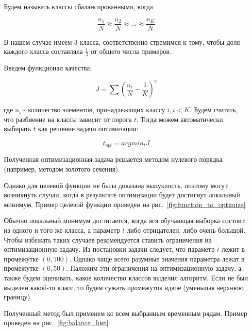 \documentclass[a4paper,article,14pt]{extarticle}
\begin{document}
Будем называть классы сбалансированными, когда

\begin{equation}
    \frac{n_1}{N} \approx \frac{n_2}{N} \approx \dots \approx \frac{n_K}{N}
    \label{eq:balanced}
\end{equation}

В нашем случае имеем 3 класса, соответственно стремимся к тому, чтобы доля каждого класса составляла $\frac{1}{3}$ от общего числа примеров.

Введем функционал качества:

\begin{equation}
    J=\sum{(\frac{n_i}{N} - \frac{1}{K}) ^ 2}
    \label{eq:error_func}
\end{equation}

где $n_i$ - количество элементов, принадлежащих классу $i, i < K$.
Будем считать, что разбиение на классы зависит от порога $t$.
Тогда можем автоматически выбирать $t$ как решение задачи оптимизации:

\begin{equation}
    t_{opt} = argmin_t J
    \label{eq:equation4}
\end{equation}

Полученная оптимизационная задача решается методом нулевого порядка (например, методом золотого сечения).

Однако для целевой функции не была доказана выпуклость, поэтому могут возникнуть случаи, когда в результате оптимизации будет достигнут локальный минимум.
Пример целевой функции приведен на рис.~\ref{fig:function_to_optimize}



Обычно локальный минимум достигается, когда вся обучающая выборка состоит из одного и того же класса, а параметр $t$ либо отрицателен, либо очень большой.
Чтобы избежать таких случаев рекомендуется ставить ограничения на оптимизационную задачу.
Из постановки задачи следует, что параметр $t$ лежит в промежутке $(0, 100)$.
Однако чаще всего разумные значения параметра лежат в промежутке $(0, 50)$.
Наложим эти ограничения на оптимизационную задачу, а также будем оценивать, какое количество классов выделил алгоритм.
Если не был выделен какой-то класс, то будем сужать промежуток вдвое (уменьшая верхнюю границу).
\linebreak

Полученный метод был применем ко всем выбранным временным рядам.
Пример приведен на рис.~\ref{fig:balance_hist}
\end{document}
